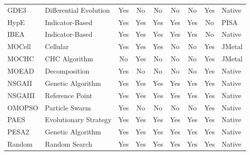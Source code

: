 \begin{sidewaystable}
\begin{tabular}{ll|cccccc|l}
  GDE3 & Differential Evolution & \cellcolor{green!25}Yes & \cellcolor{red!25}No & \cellcolor{red!25}No & \cellcolor{red!25}No & \cellcolor{red!25}No & \cellcolor{green!25}Yes & Native \\
  HypE & Indicator-Based & \cellcolor{green!25}Yes & \cellcolor{green!25}Yes & \cellcolor{green!25}Yes & \cellcolor{green!25}Yes & \cellcolor{green!25}Yes & \cellcolor{red!25}No & PISA \\
  IBEA & Indicator-Based & \cellcolor{green!25}Yes & \cellcolor{green!25}Yes & \cellcolor{green!25}Yes & \cellcolor{green!25}Yes & \cellcolor{green!25}Yes & \cellcolor{red!25}No & Native \\
  MOCell & Cellular & \cellcolor{green!25}Yes & \cellcolor{green!25}Yes & \cellcolor{green!25}Yes & \cellcolor{red!25}No & \cellcolor{red!25}No & \cellcolor{green!25}Yes & JMetal \\
  MOCHC & CHC Algorithm & \cellcolor{red!25}No & \cellcolor{green!25}Yes & \cellcolor{red!25}No & \cellcolor{red!25}No & \cellcolor{red!25}No & \cellcolor{green!25}Yes & JMetal \\
  MOEAD & Decomposition & \cellcolor{green!25}Yes & \cellcolor{red!25}No & \cellcolor{red!25}No & \cellcolor{red!25}No & \cellcolor{red!25}No & \cellcolor{green!25}Yes & Native \\
  NSGAII & Genetic Algorithm & \cellcolor{green!25}Yes & \cellcolor{green!25}Yes & \cellcolor{green!25}Yes & \cellcolor{green!25}Yes & \cellcolor{green!25}Yes & \cellcolor{green!25}Yes & Native \\
  NSGAIII & Reference Point & \cellcolor{green!25}Yes & \cellcolor{green!25}Yes & \cellcolor{green!25}Yes & \cellcolor{green!25}Yes & \cellcolor{green!25}Yes & \cellcolor{green!25}Yes & Native \\
  OMOPSO & Particle Swarm & \cellcolor{green!25}Yes & \cellcolor{red!25}No & \cellcolor{red!25}No & \cellcolor{red!25}No & \cellcolor{red!25}No & \cellcolor{green!25}Yes & Native \\
  PAES & Evolutionary Strategy & \cellcolor{green!25}Yes & \cellcolor{green!25}Yes & \cellcolor{green!25}Yes & \cellcolor{green!25}Yes & \cellcolor{green!25}Yes & \cellcolor{green!25}Yes & Native \\
  PESA2 & Genetic Algorithm & \cellcolor{green!25}Yes & \cellcolor{green!25}Yes & \cellcolor{green!25}Yes & \cellcolor{green!25}Yes & \cellcolor{green!25}Yes & \cellcolor{green!25}Yes & Native \\
  Random & Random Search & \cellcolor{green!25}Yes & \cellcolor{green!25}Yes & \cellcolor{green!25}Yes & \cellcolor{green!25}Yes & \cellcolor{green!25}Yes & \cellcolor{green!25}Yes & Native \\

\end{tabular}
\end{sidewaystable}
